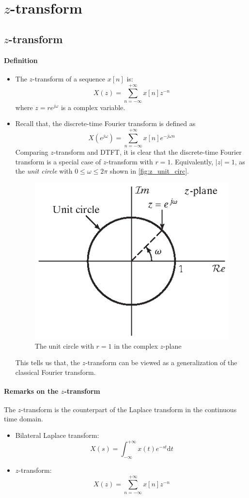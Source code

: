 \section{$z$-transform}
\subsection{$z$-transform}
\paragraph{Definition}
\begin{itemize}
    \item The $z$-transform of a sequence $x[n]$ is:
        \[
            X(z) = \sum_{n=-\infty}^{+\infty} x[n] z^{-n}
        \]
        where $z = re^{j\omega}$ is a complex variable.

    \item Recall that, the discrete-time Fourier transform is defined as
        \[
            X(e^{j\omega}) = \sum_{n=-\infty}^{+\infty} x[n] e^{-j\omega n}
        \]
    Comparing $z$-transform and DTFT, it is clear that the discrete-time Fourier transform is a special case of $z$-transform with $r=1$. Equivalently, $\lvert z \rvert = 1$, as the \textit{unit circle} with $0 \leq \omega \leq 2\pi $ shown in \autoref{fig:z_unit_circ}.
    \begin{figure}[H]
        \centering
        \includegraphics[width=.4\textwidth]{images/z_plane.eps}
        \caption{The unit circle with $r=1$ in the complex $z$-plane}
        \label{fig:z_unit_circ}
    \end{figure}
    This tells us that, the $z$-transform can be viewed as a generalization of the classical Fourier transform.
\end{itemize}

\paragraph{Remarks on the $z$-transform} The $z$-transform is the counterpart of the Laplace transform in the continuous time domain.
\begin{itemize}
    \item Bilateral Laplace transform:
    \[
        X(s) = \int_{-\infty}^{+\infty} x(t) e^{-st} \mathrm{d}t
    \]
    \item $z$-transform:
    \[
        X(z) = \sum_{n=-\infty}^{+\infty} x[n] z^{-n}
    \]
\end{itemize}


